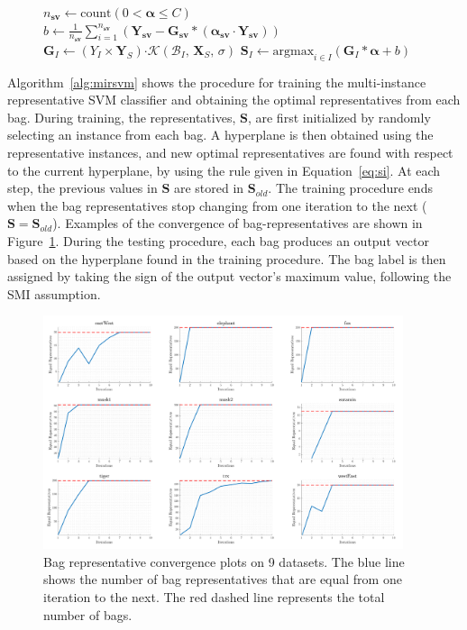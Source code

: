 \documentclass[reqno]{vcuthesis}
\newcommand{\set}[1]{{\left\{#1\right\}}}
\newcommand\tab[1][1cm]{\hspace*{#1}}
\numberwithin{equation}{chapter}
\begin{document}
\begin{figure}[b!]
\begin{minipage}{\textwidth}
\begin{algorithm}[H]
\begin{algorithmic}[1]
\State $n_{\bm{sv}} \leftarrow \text{count}\left(0 < \bm \alpha \leq C \right)$ 
\State $b \leftarrow \frac{1}{n_{\bm{sv}}}\sum_{i=1}^{n_{\bm{sv}}} \left(\bm Y_{\bm{sv}} - \bm G_{\bm{sv}}*\left(\bm{\alpha_{\bm{sv}}} \cdot \bm Y_{\bm{sv}}\right)\right)$ 
\For {$I \in \set{1,\ldots,n}$} 
\State $\bm G_I \leftarrow (Y_I \times \bm Y_S) \bm \cdot \mathcal{K}\left( \mathcal{B}_I,\,\bm X_S,\,\sigma\right)$
\State $\bm S_I \leftarrow \text{argmax}_{i \in I}\left(\bm G_I*\bm{\alpha} + b \right)$ \tab\tab[0.62cm]
\EndFor
\EndWhile 
\end{algorithmic}
\end{algorithm}
\end{minipage}
\end{figure}

Algorithm~\ref{alg:mirsvm} shows the procedure for training the multi-instance representative SVM classifier and obtaining the optimal representatives from each bag.  During training, the representatives, $\bm S$, are first initialized by randomly selecting an instance from each bag. A hyperplane is then obtained using the representative instances, and new optimal representatives are found with respect to the current hyperplane, by using the rule given in Equation~\eqref{eq:si}. At each step, the previous values in $\bm S$ are stored in $\bm S_{old}$. The training procedure ends when the bag representatives stop changing from one iteration to the next ($\bm S = \bm S_{old}$). Examples of the convergence of bag-representatives are shown in Figure~\ref{fig:convegence}. During the testing procedure, each bag produces an output vector based on the hyperplane found in the training procedure. The bag label is then assigned by taking the sign of the output vector's maximum value, following the SMI assumption. 

\begin{figure}[t!]
\centering
\includegraphics[width=0.94\textwidth]{figures/convergence.png} 
\caption{\small Bag representative convergence plots on 9 datasets. The blue line shows the number of bag representatives that are equal from one iteration to the next. The red dashed line represents the total number of bags.}\label{fig:convegence}
\end{figure}
\end{document}
